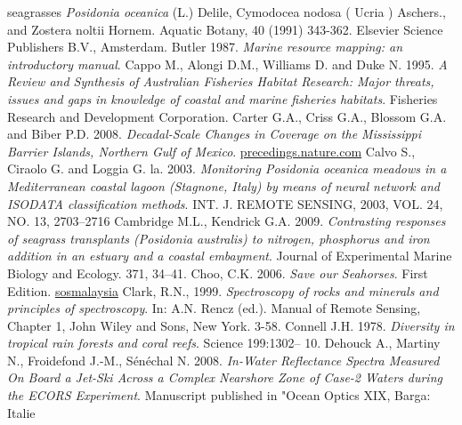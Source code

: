 \documentclass[11pt]{article}
\begin{document}
\begin{thebibliography}{999}
{seagrasses \textit{Posidonia oceanica} (L.) Delile, Cymodocea nodosa ( Ucria ) Aschers., and
Zostera noltii Hornem}. Aquatic Botany, 40 (1991) 343-362. Elsevier Science Publishers
B.V., Amsterdam. \pageref{Buia91}
Butler 1987. \emph{Marine resource mapping: an introductory manual}. \pageref{Butler87}
Cappo M., Alongi D.M., Williams D. and Duke N. 1995. \emph{A Review and Synthesis of Australian Fisheries Habitat Research: Major threats, issues and gaps in knowledge of
coastal and marine fisheries habitats}. Fisheries Research and Development Corporation. \pageref{Cappo95}
Carter G.A., Criss G.A., Blossom G.A. and Biber P.D. 2008. \emph{Decadal-Scale Changes in Coverage on the Mississippi Barrier Islands, Northern Gulf of Mexico}.
\href{http://precedings.nature.com/documents/3669/version/1/files/npre20093669-1.pdf}{precedings.nature.com} \pageref{Carter08}
Calvo S., Ciraolo G. and Loggia G. la. 2003. \emph{Monitoring \textit{Posidonia oceanica} meadows in a Mediterranean coastal lagoon (Stagnone, Italy) by means of neural network and
ISODATA classification methods}. INT. J. REMOTE SENSING, 2003, VOL. 24, NO. 13,
2703–2716 \pageref{Calvo03}
Cambridge M.L., Kendrick G.A. 2009. \emph{Contrasting responses of seagrass transplants
(Posidonia australis) to nitrogen, phosphorus and iron addition in an estuary and a coastal
embayment}. Journal of Experimental Marine Biology and Ecology. 371, 34–41. \pageref{Cambridge09}
Choo, C.K. 2006. \emph{Save our Seahorses}. First Edition. \href{www.sosmalaysia.org}{sosmalaysia} \pageref{Choo06}
Clark, R.N., 1999. \emph{Spectroscopy of rocks and minerals and principles of spectroscopy}.
In: A.N. Rencz (ed.). Manual of Remote Sensing, Chapter 1, John Wiley and Sons, New York. 3-58. \pageref{Choo06}
Connell J.H. 1978. \emph{Diversity in tropical rain forests and coral reefs}. Science 199:1302–
10. \pageref{Connell78}
Dehouck A., Martiny N., Froidefond J.-M., S\'en\'echal N. 2008. \emph{In-Water Reflectance Spectra Measured On Board a Jet-Ski Across a Complex Nearshore Zone of Case-2 Waters during the ECORS Experiment}. Manuscript published in "Ocean Optics XIX, Barga: Italie

\end{thebibliography}
\end{document}
